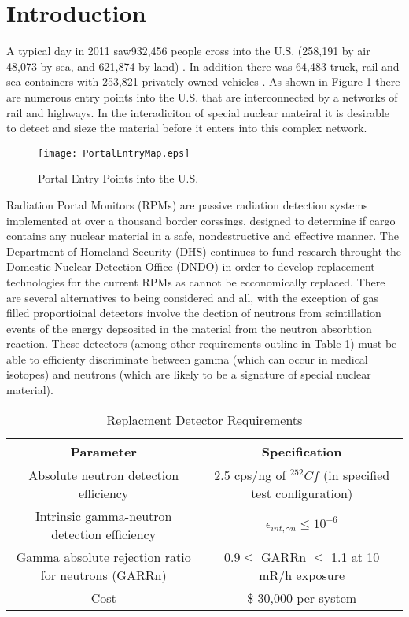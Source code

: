 \section{Introduction}
A typical day in 2011 saw932,456 people cross into the U.S. (258,191 by air 48,073 by sea, and 621,874 by land) \cite{cpb_typical_2012}.
In addition there was 64,483 truck, rail and sea containers with 253,821 privately-owned vehicles \cite{cpb_typical_2012}.
As shown in Figure \ref{fig:PortalEntryMap} there are numerous entry points into the U.S. that are interconnected by a networks of rail and highways.
In the interadiciton of special nuclear mateiral it is desirable to detect and sieze the material before it enters into this complex network.
\begin{figure}
    \texttt{[image: PortalEntryMap.eps]}
    \label{fig:PortalEntryMap}
	\caption{Portal Entry Points into the U.S.}
\end{figure}
Radiation Portal Monitors (RPMs) are passive radiation detection systems implemented at over a thousand border corssings, designed to determine if cargo contains any nuclear material in a safe, nondestructive and effective manner\cite{kouzes_neutron_2010}.
The Department of Homeland Security (DHS) continues to fund research throught the Domestic Nuclear Detection Office (DNDO) in order to develop replacement technologies for the current  RPMs as  cannot be ecconomically replaced.
There are several alternatives to  being considered and all, with the exception of gas filled proportioinal detectors involve the dection of neutrons from scintillation events of the energy depsosited in the material from the neutron absorbtion reaction.
These detectors (among other requirements outline in Table \ref{tab:DHSCriteria}) must be able to efficienty discriminate between gamma (which can occur in medical isotopes) and neutrons (which are likely to be a signature of special nuclear material).
\begin{table}
	\centering
    \caption{Replacment Detector Requirements \protect\cite{kouzes_neutron_1999}}
	\begin{tabular}{c c }
	Parameter & Specification \\
	\hline
	\hline
	Absolute neutron detection efficiency & 2.5 cps/ng of ${}^{252}Cf$ (in specified test configuration) \\
	Intrinsic gamma-neutron detection efficiency & $ \epsilon_{int,\gamma n}\leq 10^{-6}$ \\
	Gamma absolute rejection ratio for neutrons (GARRn) & $ 0.9 \leq \text{ GARRn }\leq$ 1.1 at 10 mR/h exposure \\
	Cost &  \$ 30,000 per system \\
	\hline
	\end{tabular}
    \label{tab:DHSCriteria}
\end{table}

